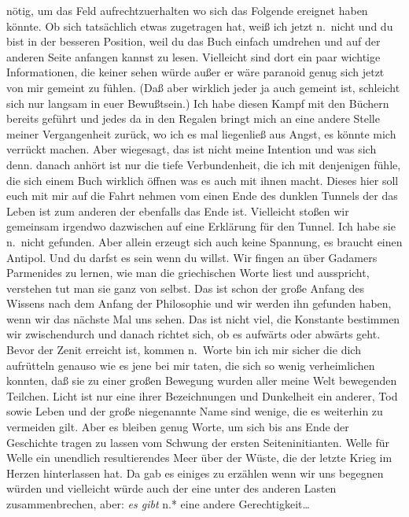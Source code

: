 \documentclass[
]{article}
\begin{document}
nötig, um das Feld aufrechtzuerhalten wo sich das Folgende ereignet
haben könnte. Ob sich tatsächlich etwas zugetragen hat, weiß ich jetzt
n.~nicht und du bist in der besseren Position, weil du das Buch einfach
umdrehen und auf der anderen Seite anfangen kannst zu lesen. Vielleicht
sind dort ein paar wichtige Informationen, die keiner sehen würde außer
er wäre paranoid genug sich jetzt von mir gemeint zu fühlen. (Daß aber
wirklich jeder ja auch gemeint ist, schleicht sich nur langsam in euer
Bewußtsein.) Ich habe diesen Kampf mit den Büchern bereits geführt und
jedes da in den Regalen bringt mich an eine andere Stelle meiner
Vergangenheit zurück, wo ich es mal liegenließ aus Angst, es könnte mich
verrückt machen. Aber wiegesagt, das ist nicht meine Intention und was
sich denn. danach anhört ist nur die tiefe Verbundenheit, die ich mit
denjenigen fühle, die sich einem Buch wirklich öffnen was es auch mit
ihnen macht. Dieses hier soll euch mit mir auf die Fahrt nehmen vom
einen Ende des dunklen Tunnels der das Leben ist zum anderen der
ebenfalls das Ende ist. Vielleicht stoßen wir gemeinsam irgendwo
dazwischen auf eine Erklärung für den Tunnel. Ich habe sie n.~nicht
gefunden. Aber allein erzeugt sich auch keine Spannung, es braucht einen
Antipol. Und du darfst es sein wenn du willst. Wir fingen an über
Gadamers Parmenides zu lernen, wie man die griechischen Worte liest und
ausspricht, verstehen tut man sie ganz von selbst. Das ist schon der
große Anfang des Wissens nach dem Anfang der Philosophie und wir werden
ihn gefunden haben, wenn wir das nächste Mal uns sehen. Das ist nicht
viel, die Konstante bestimmen wir zwischendurch und danach richtet sich,
ob es aufwärts oder abwärts geht. Bevor der Zenit erreicht ist, kommen
n.~Worte bin ich mir sicher die dich aufrütteln genauso wie es jene bei
mir taten, die sich so wenig verheimlichen konnten, daß sie zu einer
großen Bewegung wurden aller meine Welt bewegenden Teilchen. Licht ist
nur eine ihrer Bezeichnungen und Dunkelheit ein anderer, Tod sowie Leben
und der große niegenannte Name sind wenige, die es weiterhin zu
vermeiden gilt. Aber es bleiben genug Worte, um sich bis ans Ende der
Geschichte tragen zu lassen vom Schwung der ersten Seiteninitianten.
Welle für Welle ein unendlich resultierendes Meer über der Wüste, die
der letzte Krieg im Herzen hinterlassen hat. Da gab es einiges zu
erzählen wenn wir uns begegnen würden und vielleicht würde auch der eine
unter des anderen Lasten zusammenbrechen, aber: \emph{es gibt }n.* eine
andere Gerechtigkeit\ldots*
\end{document}
